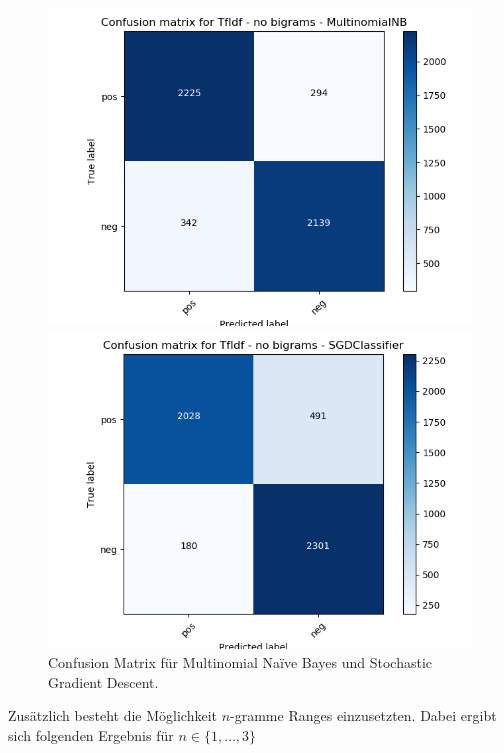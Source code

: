 \documentclass[12pt]{scrartcl}
\begin{document}
    \begin{figure}[h]
        \begin{minipage}{0.45\textwidth}
            \includegraphics[scale=.35]{pictures/tfidf_nb_mnb.png}
        \end{minipage}
        \hfill
        \begin{minipage}{0.45\textwidth}
            \includegraphics[scale=.35]{pictures/tfidf_nb_sgd.png}
        \end{minipage}
        \caption{Confusion Matrix für Multinomial Naïve Bayes und Stochastic Gradient Descent.}
    \end{figure}

    Zusätzlich besteht die Möglichkeit $n$-gramme Ranges einzusetzten.
    Dabei ergibt sich folgenden Ergebnis für $n \in \{1,\dots, 3\}$
\end{document}
